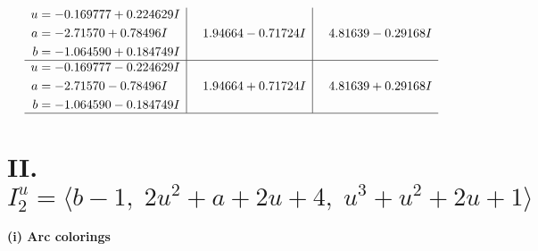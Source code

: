 \documentclass[1p]{elsarticle_modified}
\theoremstyle{definition}
\begin{document}
$$\begin{array}{c|c|c}
\begin{aligned}
u &= -0.169777 + 0.224629 I \\
a &= -2.71570 + 0.78496 I \\
b &= -1.064590 + 0.184749 I\end{aligned}
 & \phantom{-}1.94664 - 0.71724 I & \phantom{-}4.81639 - 0.29168 I \\ \hline\begin{aligned}
u &= -0.169777 - 0.224629 I \\
a &= -2.71570 - 0.78496 I \\
b &= -1.064590 - 0.184749 I\end{aligned}
 & \phantom{-}1.94664 + 0.71724 I & \phantom{-}4.81639 + 0.29168 I\\
 \hline 
 \end{array}$$\newpage\newpage\renewcommand{\arraystretch}{1}
\centering \section*{II. $I^u_{2}= \langle b-1,\;2 u^2+a+2 u+4,\;u^3+u^2+2 u+1 \rangle$}
\flushleft \textbf{(i) Arc colorings}\\
\end{document}
